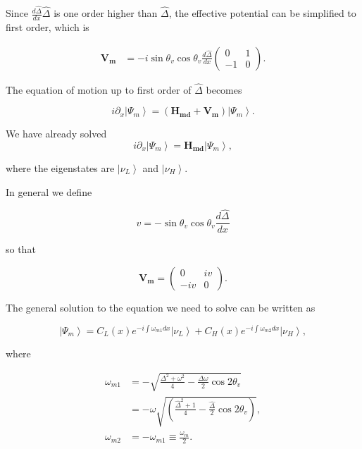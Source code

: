 \documentclass{tufte-handout}
\newcommand{\ket}[1]{\left| #1\right\rangle}
\begin{document}
Since $\frac{d\hat\Delta}{dx} \hat\Delta$ is one order higher than $\hat\Delta$, the effective potential can be simplified to first order, which is

\begin{align*}
\mathbf{V_m} & = - i\sin\theta_v \cos\theta_v \frac{d\hat\Delta}{dx} \begin{pmatrix}
0 & 1 \\
-1 & 0
\end{pmatrix}.
\end{align*}

The equation of motion up to first order of $\hat\Delta$ becomes

\begin{equation*}
i\partial_x\ket{\Psi_m} = (\mathbf{H_{md}} + \mathbf{V_m})\ket{\Psi_m}.
\end{equation*}

We have already solved
\begin{equation*}
i\partial_x\ket{\Psi_m} = \mathbf{H_{md}} \ket{\Psi_m},
\end{equation*}

where the eigenstates are $\ket{\nu_L}$ and $\ket{\nu_H}$.


In general we define

\begin{equation*}
v = -\sin\theta_v \cos\theta_v\frac{d\hat\Delta}{dx}
\end{equation*}

so that

\begin{equation*}
\mathbf{V_m} = \begin{pmatrix}
0 & i v \\
-i v & 0
\end{pmatrix}.
\end{equation*}

The general solution to the equation we need to solve can be written as

\begin{equation*}
\ket{\Psi_m} = C_L(x) e^{-i\int \omega_{m1} dx} \ket{\nu_L} + C_H(x) e^{-i\int \omega_{m2} dx} \ket{\nu_H},
\end{equation*}

where

\begin{align*}
\omega_{m1} &=-\sqrt{ \frac{\Delta^2 + \omega^2}{4}-\frac{\Delta \omega}{2} \cos 2\theta_v } \\
& = -\omega \sqrt{\left( \frac{\hat\Delta^2 + 1}{4} - \frac{\hat\Delta}{2}\cos 2\theta_v \right)} , \\
\omega_{m2} & = - \omega_{m1} \equiv \frac{\omega_m}{2}.
\end{align*}
\end{document}
